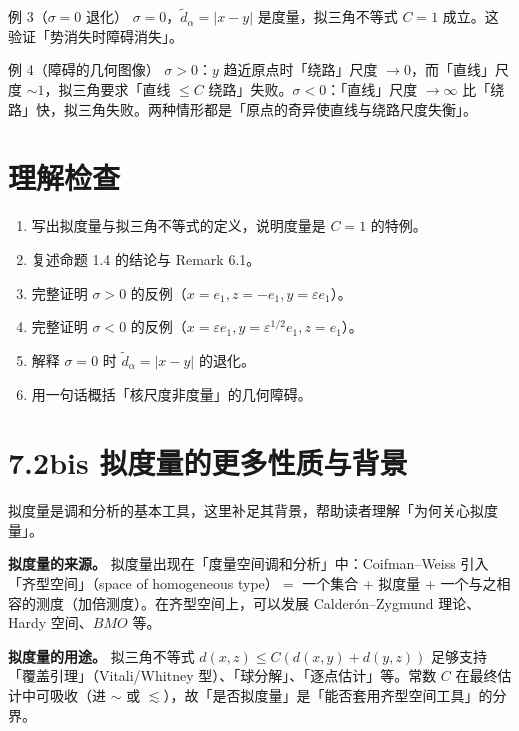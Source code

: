 \documentclass[a4paper,11pt,openany]{ctexbook}
\numberwithin{equation}{chapter}
\numberwithin{figure}{chapter}
\numberwithin{table}{chapter}
\begin{document}
\begin{examplebox}{例 3（$\sigma=0$ 退化）}
$\sigma=0$，$\widetilde d_\alpha=|x-y|$ 是度量，拟三角不等式 $C=1$ 成立。这验证「势消失时障碍消失」。
\end{examplebox}

\begin{examplebox}{例 4（障碍的几何图像）}
$\sigma>0$：$y$ 趋近原点时「绕路」尺度 $\to0$，而「直线」尺度 $\sim1$，拟三角要求「直线 $\le C$ 绕路」失败。$\sigma<0$：「直线」尺度 $\to\infty$ 比「绕路」快，拟三角失败。两种情形都是「原点的奇异使直线与绕路尺度失衡」。
\end{examplebox}

\section{理解检查}

\begin{enumerate}
\item 写出拟度量与拟三角不等式的定义，说明度量是 $C=1$ 的特例。
\item 复述命题 1.4 的结论与 Remark 6.1。
\item 完整证明 $\sigma>0$ 的反例（$x=e_1,z=-e_1,y=\varepsilon e_1$）。
\item 完整证明 $\sigma<0$ 的反例（$x=\varepsilon e_1,y=\varepsilon^{1/2}e_1,z=e_1$）。
\item 解释 $\sigma=0$ 时 $\widetilde d_\alpha=|x-y|$ 的退化。
\item 用一句话概括「核尺度非度量」的几何障碍。
\end{enumerate}

\section{7.2bis 拟度量的更多性质与背景}

拟度量是调和分析的基本工具，这里补足其背景，帮助读者理解「为何关心拟度量」。

\textbf{拟度量的来源。} 拟度量出现在「度量空间调和分析」中：Coifman–Weiss 引入「齐型空间」（space of homogeneous type）$=$ 一个集合 + 拟度量 + 一个与之相容的测度（加倍测度）。在齐型空间上，可以发展 Calderón–Zygmund 理论、Hardy 空间、$BMO$ 等。

\textbf{拟度量的用途。} 拟三角不等式 $d(x,z)\le C(d(x,y)+d(y,z))$ 足够支持「覆盖引理」（Vitali/Whitney 型）、「球分解」、「逐点估计」等。常数 $C$ 在最终估计中可吸收（进 $\sim$ 或 $\lesssim$），故「是否拟度量」是「能否套用齐型空间工具」的分界。
\end{document}
